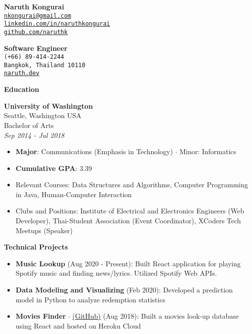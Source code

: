 \documentclass[10pt,a4paper]{article}
\newcommand{\bio}[8]{
  \noindent
  \begin{minipage}[t]{.5\textwidth}
    \textbf{\LARGE #1} \\
    \texttt{#3} \\
    \texttt{#5} \\
    \texttt{#7}
  \end{minipage}%
  \begin{minipage}[t]{.5\textwidth}
    \raggedleft
    \textbf{\large #2} \\
    \texttt{#4} \\
    \texttt{#6} \\
    \texttt{#8}
  \end{minipage}

  \vspace{6pt}
}
\newcommand{\sectionheading}[1]{
  \vspace{14pt}
  \textbf{\Large #1}
  \vspace{6pt}
}
\newcommand{\listitem}[1]{
  \item #1 \vspace{-5pt}
}
\begin{document}
%
%
\bio
{Naruth Kongurai}
{Software Engineer}
{\href{mailto:nkongurai@gmail.com}{nkongurai@gmail.com}}
{(+66) 89-414-2244}
{\href{https://linkedin.com/in/naruthkongurai}{linkedin.com/in/naruthkongurai}}
{Bangkok, Thailand 10110}
{\href{https://github.com/naruthk}{github.com/naruthk}}
{\href{https://www.naruth.dev}{naruth.dev}}

\noindent

%
%
\begin{minipage}[t]{.4\textwidth}
  \raggedright

  \sectionheading{Education}

  \textbf{University of Washington} \\
  Seattle, Washington USA \\
  Bachelor of Arts \\
  \textit{Sep 2014 - Jul 2018}

  \begin{itemize}
    \listitem{\textbf{Major}: Communications (Emphasis in Technology) $\cdot$ Minor: Informatics}
    \listitem{\textbf{Cumulative GPA}: 3.39}
    \listitem{Relevant Courses: Data Structures and Algorithms, Computer Programming in Java, Human-Computer Interaction}
    \listitem{Clubs and Positions: Institute of Electrical and Electronics Engineers
    (Web Developer), Thai-Student Association (Event Coordinator), XCoders Tech Meetups (Speaker)}
  \end{itemize}

  \sectionheading{Technical Projects}

  \begin{itemize}
    \listitem{\textbf{Music Lookup} (Aug 2020 - Present): Built React application for playing
    Spotify music and finding news/lyrics. Utilized Spotify Web APIs.}
  \end{itemize}

  \begin{itemize}
    \listitem{\textbf{Data Modeling and Visualizing} (Feb 2020): Developed a prediction model in Python
    to analyze redemption statistics}
  \end{itemize}

  \begin{itemize}
    \listitem{\textbf{Movies Finder} $\cdot$ \href{https://github.com/naruthk/movies-n-chill-app}{(GitHub)} (Aug 2018): Built a movies look-up database using React and hosted on Heroku Cloud}
  \end{itemize}


\end{minipage}
\end{document}

